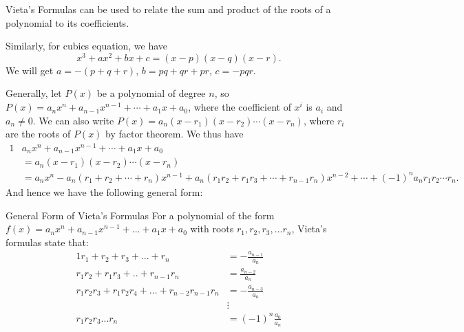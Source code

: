 
\begin{mysubsection}{}
    Vieta's Formulas can be used to relate the sum and product of the roots of a polynomial to its coefficients.

    Similarly, for cubics equation, we have
    \[x^3+ax^2+bx+c=(x-p)(x-q)(x-r).\]
    We will get $a=-(p+q+r)$, $b=pq+qr+pr$, $c=-pqr$.

    Generally, let $P(x)$ be a polynomial of degree $n$, so $P(x)={a_n}x^n+{a_{n-1}}x^{n-1}+\cdots+{a_1}x+a_0$, where the coefficient of $x^{i}$ is ${a}_i$ and $a_n \neq 0$. We can also write $P(x)=a_n(x-r_1)(x-r_2)\cdots(x-r_n)$, where ${r}_i$ are the roots of $P(x)$ by factor theorem. We thus have
    \begin{alignat*}{1}
        &a_nx^n+a_{n-1}x^{n-1}+\cdots+a_1x+a_0\\
        &= a_n(x-r_1)(x-r_2)\cdots(x-r_n)\\
        &= a_nx^n - a_n(r_1+r_2+\!\cdots\!+r_n)x^{n-1} + a_n(r_1r_2 + r_1r_3 +\! \cdots\! + r_{n-1}r_n)x^{n-2} +\! \cdots\! + (-1)^na_n r_1r_2\cdots r_n.
    \end{alignat*}
    And hence we have the following general form:

    \begin{theorem}[thm:]{General Form of Vieta's Formulas}
        For a polynomial of the form $f(x)=a_nx^n+a_{n-1}x^{n-1}+...+a_1x+a_0$ with roots $r_1,r_2,r_3,...r_n$, Vieta's formulas state that: 
        \begin{alignat*}{1}
            r_1+r_2+r_3+...+r_n&=-\frac{a_{n-1}}{a_n} \\ r_1r_2+r_1r_3+..+r_{n-1}r_n&=\frac{a_{n-2}}{a_n} \\ r_1r_2r_3+r_1r_2r_4+...+r_{n-2}r_{n-1}r_n&=-\frac{a_{n-3}}{a_n} \\ &\vdots \\ r_1r_2r_3...r_n&=(-1)^n\frac{a_0}{a_n} 
        \end{alignat*}
    \end{theorem}
\end{mysubsection}


